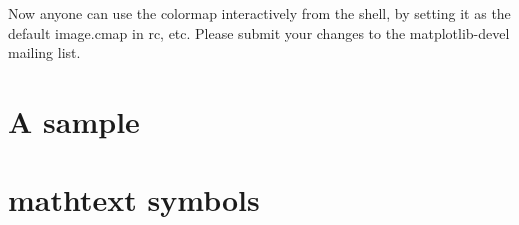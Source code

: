 \documentclass[]{book}
\begin{document}
\noindent Now anyone can use the colormap interactively from the shell, by
setting it as the default image.cmap in rc, etc.  Please submit your
changes to the matplotlib-devel mailing list.

\appendix

\chapter{A sample }
\label{cha:rc}


\chapter{mathtext symbols}
\label{cha:math_symbols}



\end{document}
